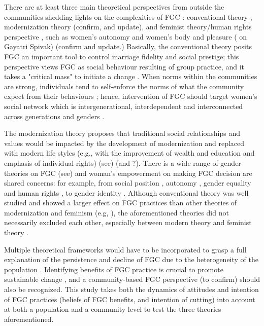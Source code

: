 \documentclass[12pt,]{article}
\begin{document}
There are at least three main theoretical perspectives from outside the communities
shedding lights on the complexities of FGC \cite{Hayf05, Youn02}:  conventional theory \cite{Mack96, Mack00, Mack06, MackLeJe09, DuncWand11}, modernization theory\cite{BoylMcMo02, Youn02} (confirm, and update), and feminist theory/human rights perspective \cite{Dell04, FrieMahm13,KhosBane17, Lewi95, Lewi09, Meye00, Morr08, Njam04, UNIC16, YirgKass12, Youn02}, such as women's autonomy \cite{Meye00} and women's body and pleasure (\cite{Morr08} on Gayatri Spivak) (confirm and update.)  Basically, the conventional theory posits FGC an important tool to control marriage fidelity and social prestige; this perspective views FGC as social behaviour resulting of group practice, and it takes a "critical mass" to initiate a change \cite{Mack00, MackLeJe09}.  When norms within the communities are strong, individuals tend to self-enforce the norms of what the community expect from their behaviours \cite{Ajze02, Hayf05, KandNwak09, Mack96, Mack06, MackLeJe09, ThomMadd92}; hence, intervention of FGC should target women's social network which is intergenerational, interdependent and interconnected across generations and genders \cite{Mack00, DuncWand11}.

The modernization theory proposes that traditional social relationships and values would be impacted by the development of modernization and replaced with modern life styles (e.g., with the improvement of wealth and education and emphasis of individual rights) (see\cite{Moor13}) (and \cite{BoylMcMo02, Youn02}?).  There is a wide range of gender theories on FGC (see\cite{Anti13, Hodg11, Lewi95}) and woman’s empowerment on making FGC decision are shared concerns:  for example, from social position \cite{VanMeek15}, autonomy \cite{Meye00}, gender equality and human rights \cite{Drol11}, to gender identity \cite{Youn04, Koom14, WintKoom09}.  Although conventional theory was well studied and showed a larger effect on FGC practices than other theories of modernization and feminism (e.g, \cite{BoylMcMo02, BoylCorl10, FreyJohn07, FrieMahm13, Hayf05, KandMwek09, Mack96, Mack06, ReigGonz14, YirgKass12}), the aforementioned theories did not necessarily excluded each other, especially between modern theory and feminist theory \cite{Hayf05}.

Multiple theoretical frameworks would have to be incorporated to grasp a full explanation of the persistence and decline of FGC due to the heterogeneity of the population \cite{Hayf05, EffeVogt15, ModrLiu13}.  Identifying benefits of FGC practice is crucial to promote sustainable change \cite{EffeVogt15}, and a community-based FGC perspective \cite{BoylCorl010, Drol11,Hayf05, Grue05, Hodg11, KandNwak09, OdukAfol17} (to confirm) should also be recognized.  This study takes both the dynamics of attitudes and intention of FGC practices (beliefs of FGC benefits, and intention of cutting) into account at both a population and a community level to test the three theories aforementioned.
\end{document}
